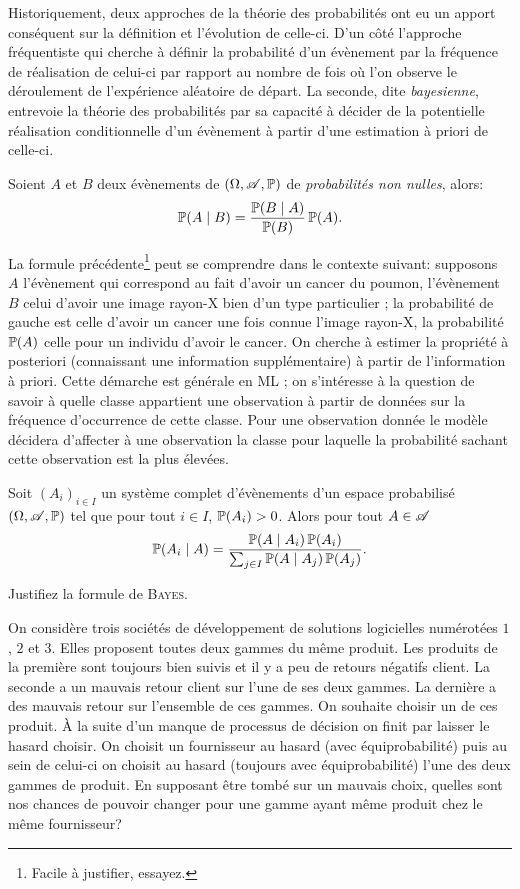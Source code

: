 \documentclass[11pt, a4paper]{article}
\begin{document}
Historiquement, deux approches de la théorie des probabilités ont eu
un apport conséquent sur la définition et l'évolution de
celle-ci. D'un côté l'approche fréquentiste qui cherche à définir la
probabilité d'un évènement par la fréquence de réalisation de celui-ci
par rapport au nombre de fois où l'on observe le déroulement de
l'expérience aléatoire de départ. La seconde, dite
\textit{bayesienne}, entrevoie la théorie des probabilités par sa
capacité à décider de la potentielle réalisation conditionnelle d'un
évènement à partir d'une estimation à priori de celle-ci.
\begin{prop}
  Soient $A$ et $B$ deux évènements de $(\Omega, \mathscr{A}, \operatorname{\mathbb{P}})$ de
  \textit{probabilités non nulles}, alors:
  \[
    \operatorname{\mathbb{P}}(A \mid B) = \frac{\operatorname{\mathbb{P}}(B \mid A)}{\operatorname{\mathbb{P}}(B)} \operatorname{\mathbb{P}}(A).
  \]
\end{prop}
La formule précédente\footnote{Facile à justifier, essayez.} peut se
comprendre dans le contexte suivant: supposons $A$ l'évènement qui
correspond au fait d'avoir un cancer du poumon, l'évènement $B$ celui
d'avoir une image rayon-X bien d'un type particulier ; la
probabilité de gauche est celle d'avoir un cancer une fois connue
l'image rayon-X, la probabilité $\operatorname{\mathbb{P}}(A)$ celle pour un individu
d'avoir le cancer. On cherche à estimer la propriété à posteriori
(connaissant une information supplémentaire) à partir de l'information
à priori. Cette démarche est générale en ML ; on s'intéresse à la
question de savoir à quelle classe appartient une observation à partir
de données sur la fréquence d'occurrence de cette classe. Pour une
observation donnée le modèle décidera d'affecter à une observation la
classe pour laquelle la probabilité sachant cette observation est la
plus élevées.
\begin{prop}
  Soit $(A_i)_{i \in I}$ un système complet d'évènements d'un espace
  probabilisé $(\Omega, \mathscr{A}, \operatorname{\mathbb{P}})$ tel que pour tout $i \in I$,
  $\operatorname{\mathbb{P}}(A_i) > 0$. Alors pour tout $A \in \mathscr{A}$
  \[
    \operatorname{\mathbb{P}}(A_i \mid A) = \frac{\operatorname{\mathbb{P}}(A \mid A_i)\operatorname{\mathbb{P}}(A_i)}{\sum_{j \in
        I}\operatorname{\mathbb{P}}(A\mid A_j)\operatorname{\mathbb{P}}(A_j)}.
  \]
\end{prop}
\begin{question}
  Justifiez la formule de \textsc{Bayes}.
\end{question}
\begin{question}
  On considère trois sociétés de développement de solutions
  logicielles numérotées $1$, $2$ et $3$. Elles proposent toutes deux
  gammes du même produit. Les produits de la première sont toujours
  bien suivis et il y a peu de retours négatifs client. La seconde a
  un mauvais retour client sur l'une de ses deux gammes. La dernière a
  des mauvais retour sur l'ensemble de ces gammes. On souhaite choisir
  un de ces produit. À la suite d'un manque de processus de décision
  on finit par laisser le hasard choisir. On choisit un fournisseur au
  hasard (avec équiprobabilité) puis au sein de celui-ci on choisit au
  hasard (toujours avec équiprobabilité) l'une des deux gammes de
  produit. En supposant être tombé sur un mauvais choix, quelles sont
  nos chances de pouvoir changer pour une gamme ayant même produit
  chez le même fournisseur?
\end{question}
\end{document}
